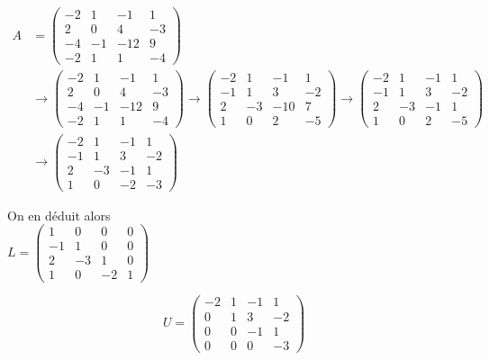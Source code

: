 \documentclass[10pt]{article}
\begin{document}
\[
\begin{aligned}
A & =\left(\begin{array}{cccc}
-2 & 1 & -1 & 1 \\
2 & 0 & 4 & -3 \\
-4 & -1 & -12 & 9 \\
-2 & 1 & 1 & -4
\end{array}\right) \\
& \rightarrow\left(\begin{array}{cccc}
-2 & 1 & -1 & 1 \\
2 & 0 & 4 & -3 \\
-4 & -1 & -12 & 9 \\
-2 & 1 & 1 & -4
\end{array}\right) \rightarrow\left(\begin{array}{cccc}
-2 & 1 & -1 & 1 \\
-1 & 1 & 3 & -2 \\
2 & -3 & -10 & 7 \\
1 & 0 & 2 & -5
\end{array}\right) \rightarrow\left(\begin{array}{cccc}
-2 & 1 & -1 & 1 \\
-1 & 1 & 3 & -2 \\
2 & -3 & -1 & 1 \\
1 & 0 & 2 & -5
\end{array}\right) \\
& \rightarrow\left(\begin{array}{cccc}
-2 & 1 & -1 & 1 \\
-1 & 1 & 3 & -2 \\
2 & -3 & -1 & 1 \\
1 & 0 & -2 & -3
\end{array}\right)
\end{aligned}
\]

On en déduit alors\\
\(L=\left(\begin{array}{cccc}1 & 0 & 0 & 0 \\ -1 & 1 & 0 & 0 \\ 2 & -3 & 1 & 0 \\ 1 & 0 & -2 & 1\end{array}\right)\)

\[
U=\left(\begin{array}{cccc}
-2 & 1 & -1 & 1 \\
0 & 1 & 3 & -2 \\
0 & 0 & -1 & 1 \\
0 & 0 & 0 & -3
\end{array}\right)
\]
\end{document}
